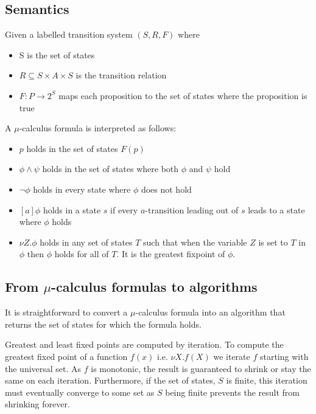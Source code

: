 \subsection{Semantics}

Given a labelled transition system $(S, R, F)$ where
\begin{itemize}
    \item S is the set of states
    \item $R \subseteq S \times A \times S$ is the transition relation
    \item $F : P \rightarrow 2^S$ maps each proposition to the set of states where the proposition is true
\end{itemize}

\noindent A $\mu$-calculus formula is interpreted as follows:
\begin{itemize}
    \item $p$ holds in the set of states $F(p)$
    \item $\phi \wedge \psi$ holds in the set of states where both $\phi$ and $\psi$ hold
    \item $\neg \phi$ holds in every state where $\phi$ does not hold 
    \item $[a]\phi$ holds in a state $s$ if every $a$-transition leading out of $s$ leads to a state where $\phi$ holds
    \item $\nu Z. \phi$ holds in any set of states $T$ such that when the variable $Z$ is set to $T$ in $\phi$ then $\phi$ holds for all of $T$. It is the greatest fixpoint of $\phi$.
\end{itemize}

\subsection{From $\mu$-calculus formulas to algorithms}

It is straightforward to convert a $\mu$-calculus formula into an algorithm that returns the set of states for which the formula holds.

Greatest and least fixed points are computed by iteration. To compute the greatest fixed point of a function $f(x)$ i.e. $\nu X. f(X)$ we iterate $f$ starting with the universal set. As $f$ is monotonic, the result is guaranteed to shrink or stay the same on each iteration. Furthermore, if the set of states, $S$ is finite, this iteration must eventually converge to some set as $S$ being finite prevents the result from shrinking forever. 

